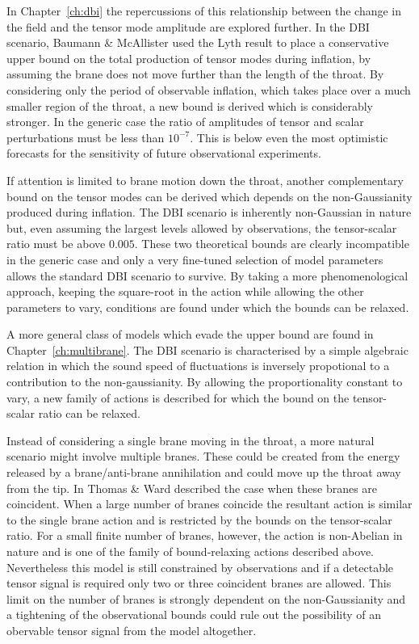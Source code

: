 In Chapter~\ref{ch:dbi} the repercussions of this relationship between the change in
the field and the tensor mode amplitude are explored further. In the DBI scenario,
Baumann \& McAllister \cite{bmpaper} used the Lyth result to place a conservative
upper bound on the total production of tensor modes during inflation, by assuming the
brane does not move further than the length of the throat. By considering only the
period of observable inflation, which takes place over a much smaller region of the
throat, a new bound is derived which is considerably stronger. In the generic
case the ratio of amplitudes of tensor and scalar perturbations must be less than
$10^{-7}$. This is below  even the most optimistic forecasts for
the sensitivity of future observational experiments. 

If attention is limited to brane motion down the throat, another complementary bound
on the tensor modes can be derived which depends on the non-Gaussianity produced
during inflation. The DBI scenario is inherently non-Gaussian in nature but, even
assuming the largest levels allowed by observations, the tensor-scalar ratio must be
above $0.005$. These two theoretical bounds are clearly incompatible in the generic
case and only a very fine-tuned selection of model parameters allows the standard DBI
scenario to survive. By taking a more phenomenological approach, keeping
the square-root in the action while allowing the other parameters to vary,
conditions are found under which the bounds can be relaxed.


A more general class of models which evade the upper bound are found in
Chapter~\ref{ch:multibrane}. The DBI scenario is characterised by a simple
algebraic relation in which the sound speed of fluctuations is inversely
propotional to a contribution to the non-gaussianity. By allowing the
proportionality constant to vary, a new family of actions is described for which the
bound on the tensor-scalar ratio can be relaxed. 

Instead of considering a single brane moving in the throat, a more natural scenario
might involve multiple branes. These could be created from the energy released by a
brane/anti-brane annihilation and could move up the throat away from the tip.
In  Thomas \& Ward described the case when these branes are
coincident. When a large number of branes coincide the resultant action is similar
to the single brane action and is restricted by the bounds on the tensor-scalar
ratio. For a small finite number of branes, however, the action is non-Abelian in
nature and is one of the family of bound-relaxing actions described above.
Nevertheless this model is still constrained by observations and if a detectable
tensor signal is required only two or three coincident branes
are allowed. This limit on the number of branes is strongly dependent on the
non-Gaussianity and a tightening of the observational bounds could rule out the
possibility of an obervable tensor signal from the model altogether.


